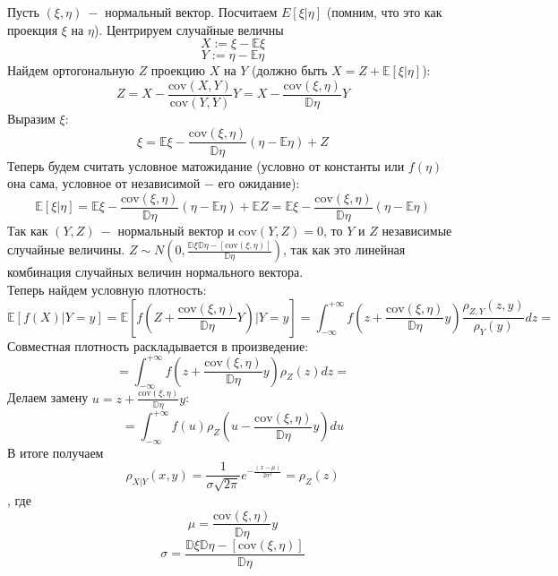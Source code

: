 \begin{example}
Пусть $\left(\xi, \eta\right) \ - $ нормальный вектор. Посчитаем $E\left[\xi | \eta\right]$ (помним, что это как проекция $\xi$ на $\eta$). Центрируем случайные величны
\[
    X := \xi - \mathbb{E} \xi
\]
\[
    Y := \eta - \mathbb{E} \eta
\]
Найдем ортогональную $Z$ проекцию $X$ на $Y$ (должно быть $X = Z + \mathbb{E}\left[\xi | \eta\right]$):
\[
    Z = X - \frac{\text{cov}\left(X, Y\right)}{\text{cov}\left(Y, Y\right)}Y = 
    X - \frac{\text{cov}\left(\xi, \eta\right)}{\mathbb{D}\eta}Y
\]
Выразим $\xi$:
\[
    \xi = \mathbb{E} \xi - \frac{\text{cov}\left(\xi, \eta\right)}{\mathbb{D}\eta}\left(\eta - \mathbb{E} \eta\right) + Z
\]
Теперь будем считать условное матожидание (условно от константы или $f\left(\eta\right)$ она сама, условное от независимой $-$ его ожидание):
\[
    \mathbb{E}\left[\xi | \eta\right] = \mathbb{E}\xi - \frac{\text{cov}\left(\xi, \eta\right)}{\mathbb{D}\eta}\left(\eta - \mathbb{E} \eta\right) + \mathbb{E} Z = \mathbb{E}\xi - \frac{\text{cov}\left(\xi, \eta\right)}{\mathbb{D}\eta}\left(\eta - \mathbb{E} \eta\right)
\]
Так как $\left(Y, Z\right) \ -$ нормальный вектор и $\text{cov}\left(Y, Z\right) = 0$, то $Y$ и $Z$ независимые случайные величины. $Z \sim N\left(0, \frac{\mathbb{D} \xi \mathbb{D} \eta - \left[\text{cov}\left(\xi, \eta\right)\right]}{\mathbb{D} \eta}\right)$, так как это линейная комбинация случайных величин нормального вектора. \\
Теперь найдем условную плотность:
\[
    \mathbb{E}\left[f\left(X\right) | Y = y\right] = \mathbb{E} \left[f\left(Z + \frac{\text{cov}\left(\xi, \eta\right)}{\mathbb{D}\eta}Y\right) | Y = y\right] = \int_{-\infty}^{+\infty} f\left(z + \frac{\text{cov}\left(\xi, \eta\right)}{\mathbb{D}\eta}y\right) \frac{\rho_{Z, Y}\left(z, y\right)}{\rho_{Y}\left(y\right)} dz = 
\]
Совместная плотность раскладывается в произведение:
\[
    = \int_{-\infty}^{+\infty} f\left(z + \frac{\text{cov}\left(\xi, \eta\right)}{\mathbb{D}\eta}y\right) \rho_{Z}\left(z\right) dz = 
\]
Делаем замену $u = z + \frac{\text{cov}\left(\xi, \eta\right)}{\mathbb{D}\eta}y$:
\[
    = \int_{-\infty}^{+\infty} f\left(u\right) \rho_Z\left(u - \frac{\text{cov}\left(\xi, \eta\right)}{\mathbb{D}\eta} y\right) du
\]
В итоге получаем
\[
    \rho_{X|Y}\left(x, y\right) = \frac{1}{\sigma \sqrt{2\pi}} e ^ {-\frac{\left(x - \mu\right)}{2 \sigma ^ 2}} = \rho_{Z}\left(z \right)
\], где
\[
    \mu  = \frac{\text{cov}\left(\xi, \eta\right)}{\mathbb{D}\eta} y
\]
\[
    \sigma = \frac{\mathbb{D} \xi \mathbb{D} \eta - \left[\text{cov}\left(\xi, \eta\right)\right]}{\mathbb{D} \eta}
\]
\end{example}


